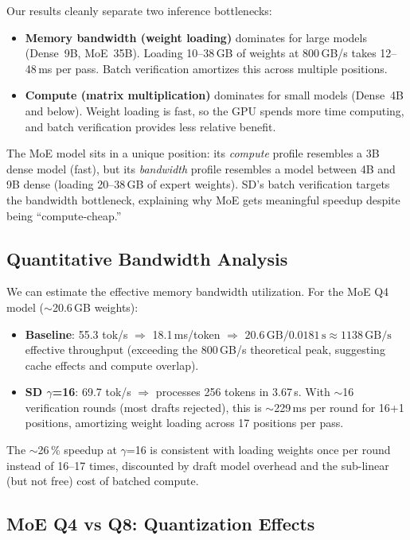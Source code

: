 \documentclass[11pt,a4paper]{article}
\begin{document}
Our results cleanly separate two inference bottlenecks:

\begin{itemize}[nosep,leftmargin=*]
  \item \textbf{Memory bandwidth (weight loading)} dominates for large models (Dense~9B, MoE~35B). Loading 10--38\,GB of weights at 800\,GB/s takes 12--48\,ms per pass. Batch verification amortizes this across multiple positions.
  \item \textbf{Compute (matrix multiplication)} dominates for small models (Dense~4B and below). Weight loading is fast, so the GPU spends more time computing, and batch verification provides less relative benefit.
\end{itemize}

The MoE model sits in a unique position: its \emph{compute} profile resembles a 3B dense model (fast), but its \emph{bandwidth} profile resembles a model between 4B and 9B dense (loading 20--38\,GB of expert weights). SD's batch verification targets the bandwidth bottleneck, explaining why MoE gets meaningful speedup despite being ``compute-cheap.''

\subsection{Quantitative Bandwidth Analysis}

We can estimate the effective memory bandwidth utilization. For the MoE Q4 model ($\sim$20.6\,GB weights):
\begin{itemize}[nosep,leftmargin=*]
  \item \textbf{Baseline}: 55.3 tok/s $\Rightarrow$ 18.1\,ms/token $\Rightarrow$ $20.6\,\text{GB} / 0.0181\,\text{s} \approx 1138\,\text{GB/s}$ effective throughput (exceeding the 800\,GB/s theoretical peak, suggesting cache effects and compute overlap).
  \item \textbf{SD $\gamma$=16}: 69.7 tok/s $\Rightarrow$ processes 256 tokens in 3.67\,s. With $\sim$16 verification rounds (most drafts rejected), this is $\sim$229\,ms per round for 16+1 positions, amortizing weight loading across 17 positions per pass.
\end{itemize}

The $\sim$26\,\% speedup at $\gamma$=16 is consistent with loading weights once per round instead of 16--17 times, discounted by draft model overhead and the sub-linear (but not free) cost of batched compute.

\subsection{MoE Q4 vs Q8: Quantization Effects}
\end{document}
